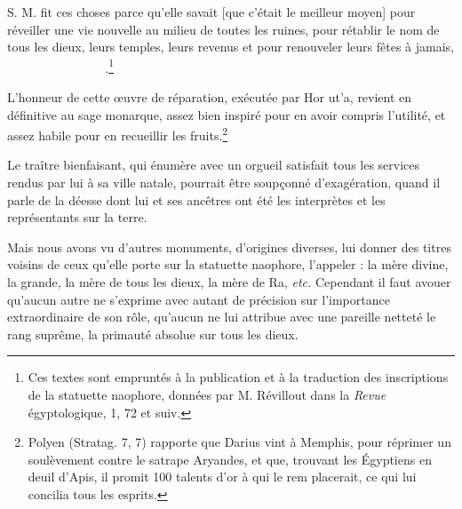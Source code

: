\documentclass[letterpaper,twocolumn,openany,nodeprecatedcode]{dndbook}
\newcommand*\hieroAAAH{}
\newcommand*\hieroAABC{\raisebox{0.5ex}{}}
\newcommand*\hieroAACS{}
\newcommand*\hieroAAEF{}
\newcommand*\hieroAAEK{}
\newcommand*\hieroAAEP{\raisebox{0.5ex}{}}
\newcommand*\hieroAAFH{}
\newcommand*\hieroAAHX{}
\newcommand*\hieroAAKT{}
\newcommand*\hieroAALO{}
\newcommand*\hieroAAOH{\raisebox{0.3ex}{}}
\newcommand*\hieroAAOX{}
\newcommand*\hieroAARZ{}
\newcommand*\hieroAASC{}
\newcommand*\hieroAAVY{}
\newcommand*\hieroAAWH{}
\newcommand*\hieroAAWO{}
\newcommand*\hieroAAYI{\raisebox{0.5ex}{}}
\newcommand*\hieroABBP{}
\newcommand*\hieroABBW{}
\newcommand*\hieroABCF{}
\newcommand*\hieroABCG{}
\newcommand*\hieroABCH{}
\newcommand*\hieroABCI{}
\newcommand*\hieroABCJ{}
\newcommand*\hieroABCK{}
\begin{document}
S. M. fit ces choses parce qu’elle savait [que c'était le meilleur moyen] pour réveiller une vie nouvelle au milieu de toutes les ruines, pour rétablir le nom de tous les dieux, leurs temples, leurs revenus et pour renouveler leurs fêtes à jamais, $\hieroAAKT\:\hieroABBW\:\hieroABBP\allowbreak\:\hieroABBP\:\hieroAAYI\:\hieroABCF\allowbreak\:\hieroAASC\hieroAASC\hieroAASC\hieroAASC\allowbreak\:\hieroAAOH\:\hieroAAEP\allowbreak\:\hieroAACS\:\hieroAARZ\allowbreak\:\hieroAALO\:\hieroABCG\:\hieroAAAH\allowbreak\:\hieroAAAH\:\hieroABCH\:\hieroAAOX\allowbreak\:\hieroAABC\:\hieroAAEP\:\hieroAACS\allowbreak\:\hieroAAFH\:\hieroAAVY\:\hieroAAEK\:\hieroAAEK\allowbreak\:\hieroAAEK\:\hieroAABC\:\hieroABCI\allowbreak\:\hieroAAEF\:\hieroAAHX\:\hieroAAEK\allowbreak\:\hieroABCJ\:\hieroAAHX\:\hieroABCK\allowbreak\:\hieroAAWH\:\hieroAAHX\:\hieroAAWO$.\footnote{Ces textes sont empruntés à la publication et à la traduction des inscriptions de la statuette naophore, données par M. Révillout dans la \emph{Revue} égyptologique, 1, 72 et suiv.}

L'honneur de cette œuvre de réparation, exécutée par Hor ut'a, revient en définitive au sage monarque, assez bien inspiré pour en avoir compris l'utilité, et assez habile pour en recueillir les fruits.\footnote{Polyen (Stratag. 7, 7) rapporte que Darius vint à Memphis, pour réprimer un soulèvement contre le satrape Aryandes, et que, trouvant les Égyptiens en deuil d'Apis, il promit 100 talents d'or à qui le rem placerait, ce qui lui concilia tous les esprits.}

Le traître bienfaisant, qui énumère avec un orgueil satisfait tous les services rendus par lui à sa ville natale, pourrait être soupçonné d'exagération, quand il parle de la déesse dont lui et ses ancêtres ont été les interprètes et les représentants sur la terre.

Mais nous avons vu d'autres monuments, d'origines diverses, lui donner des titres voisins de ceux qu'elle porte sur la statuette naophore, l'appeler : la mère divine, la grande, la mère de tous les dieux, la mère de Ra, \emph{etc.} Cependant il faut avouer qu'aucun autre ne s'exprime avec autant de précision sur l'importance extraordinaire de son rôle, qu'aucun ne lui attribue avec une pareille netteté le rang suprême, la primauté absolue sur tous les dieux.
\end{document}
